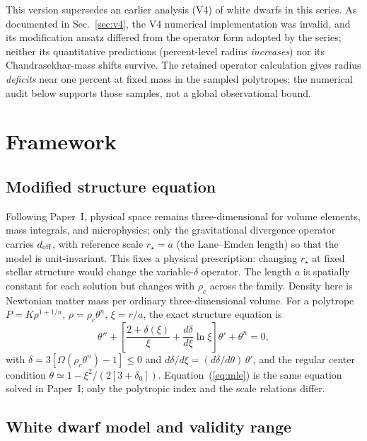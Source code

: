 \documentclass[twocolumn,prd,superscriptaddress,nofootinbib]{revtex4-2}
\begin{document}
This version supersedes an earlier analysis (V4) of white dwarfs in this
series. As documented in Sec.~\ref{sec:v4}, the V4 numerical
implementation was invalid, and its modification ansatz differed from the
operator form adopted by the series; neither its quantitative predictions
(percent-level radius \emph{increases}) nor its Chandrasekhar-mass shifts
survive. The retained operator calculation gives radius \emph{deficits}
near one percent at fixed mass in the sampled polytropes; the numerical
audit below supports those samples, not a global observational bound.

\section{Framework}

\subsection{Modified structure equation}

Following Paper~I, physical space remains three-dimensional for volume
elements, mass integrals, and microphysics; only the gravitational
divergence operator carries $d_{\rm eff}$, with reference scale
$r_\star = a$ (the Lane--Emden length) so that the model is
unit-invariant. This fixes a physical prescription: changing $r_\star$
at fixed stellar structure would change the variable-$\delta$ operator.
The length $a$ is spatially constant for each solution but changes with
$\rho_c$ across the family. Density here is Newtonian matter mass per
ordinary three-dimensional volume. For a polytrope $P = K\rho^{1+1/n}$, $\rho = \rho_c
\theta^n$, $\xi = r/a$, the exact structure equation is
\begin{equation}
\theta'' + \left[\frac{2+\delta(\xi)}{\xi}
+ \frac{d\delta}{d\xi}\ln\xi\right]\theta' + \theta^{n} = 0,
\label{eq:mle}
\end{equation}
with $\delta = 3[\Omega(\rho_c\theta^n) - 1] \le 0$ and
$d\delta/d\xi = (d\delta/d\theta)\,\theta'$, and the regular center
condition $\theta \simeq 1 - \xi^2/(2[3+\delta_0])$. Equation~(\ref{eq:mle})
is the same equation solved in Paper~I; only the polytropic index and the
scale relations differ.

\subsection{White dwarf model and validity range}
\end{document}
